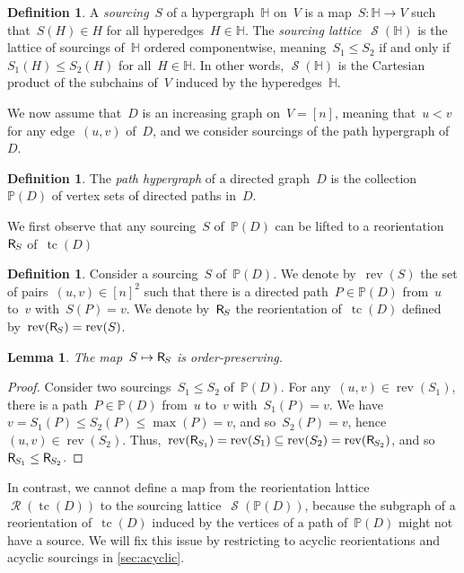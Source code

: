 \documentclass{amsart}
\newtheorem{lemma}[theorem]{Lemma}
\theoremstyle{definition}
\newtheorem{definition}[theorem]{Definition}
\renewcommand{\c}[1]{\mathcal{#1}} %
\DeclareMathOperator{\tc}{tc} %
\newcommand{\darkblue}{\color{darkblue}} %
\newcommand{\defn}[1]{\textsl{\darkblue #1}} %
\newcommand{\mymap}[2]{\mathsf{#1}_{\hspace{-.7pt}#2}}
\DeclareMathOperator{\Reori}{\c{R}}  %
\newcommand{\reori}[1]{\mymap{R}{#1}}  %
\DeclareMathOperator{\rev}{rev} %
\DeclareMathOperator{\Sour}{\mathcal{S}}  %
\newcommand{\HH}{\mathbb H}  %
\newcommand{\PP}{\mathbb P} %
\begin{document}
\begin{definition}
\label{def:Sour}
A \defn{sourcing}~$S$ of a hypergraph~$\HH$ on~$V$ is a map~$S : \HH \to V$ such that~$S(H) \in H$ for all hyperedges~$H \in \HH$.
The \defn{sourcing lattice}~$\Sour(\HH)$ is the lattice of sourcings of~$\HH$ ordered componentwise, meaning~$S_1 \le S_2$ if and only if~$S_1(H) \le S_2(H)$ for all~$H \in \HH$.
In other words, $\Sour(\HH)$ is the Cartesian product of the subchains of~$V$ induced by the hyperedges~$\HH$.
\end{definition}

We now assume that~$D$ is an increasing graph on~$V = [n]$, meaning that~$u < v$ for any edge~$(u,v)$ of~$D$, and we consider sourcings of the path hypergraph of~$D$.

\begin{definition}
\label{def:pathHypergraph}
The \defn{path hypergraph} of a directed graph~$D$ is the collection~$\PP(D)$ of vertex sets of directed paths in~$D$.
\end{definition}

We first observe that any sourcing~$S$ of~$\PP(D)$ can be lifted to a reorientation~$\reori{S}$ of~$\tc(D)$

\begin{definition}
\label{def:Sour2Reori}
Consider a sourcing~$S$ of~$\PP(D)$.
We denote by~$\rev(S)$ the set of pairs~$(u,v) \in [n]^2$ such that there is a directed path~$P \in \PP(D)$ from~$u$ to~$v$ with~$S(P) = v$.
We denote by~$\reori{S}$ the reorientation of~$\tc(D)$ defined by~$\rev(\reori{S}) = \rev(S)$.
\end{definition}

\begin{lemma}
\label{lem:Sour2Reori}
The map~$S \mapsto \reori{S}$ is order-preserving.
\end{lemma}

\begin{proof}
Consider two sourcings~$S_1 \le S_2$ of~$\PP(D)$.
For any~$(u,v) \in \rev(S_1)$, there is a path~$P \in \PP(D)$ from~$u$ to~$v$ with~$S_1(P) = v$.
We have~$v = S_1(P) \le S_2(P) \le \max(P) = v$, and so~$S_2(P) = v$, hence~$(u,v) \in \rev(S_2)$.
Thus,~$\rev(\reori{S_1}) = \rev(S_1) \subseteq \rev(S_2) = \rev(\reori{S_2})$, and so~${\reori{S_1} \le \reori{S_2}}$.
\end{proof}

In contrast, we cannot define a map from the reorientation lattice~$\Reori(\tc(D))$ to the sourcing lattice~$\Sour(\PP(D))$, because the subgraph of a reorientation of~$\tc(D)$ induced by the vertices of a path of~$\PP(D)$ might not have a source.
We will fix this issue by restricting to acyclic reorientations and acyclic sourcings in \cref{sec:acyclic}.
\end{document}
